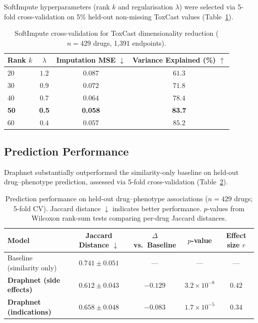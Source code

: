 \documentclass[11pt]{article}
\begin{document}
SoftImpute hyperparameters (rank $k$ and regularisation $\lambda$) were selected via 5-fold cross-validation on 5\% held-out non-missing ToxCast values (Table~\ref{tab:softimpute}).

\begin{table}[H]
\centering
\caption{SoftImpute cross-validation for ToxCast dimensionality reduction ($n = 429$ drugs, 1,391 endpoints).}
\label{tab:softimpute}
\begin{tabular}{lccc}
\toprule
Rank $k$ & $\lambda$ & Imputation MSE $\downarrow$ & Variance Explained (\%) $\uparrow$ \\
\midrule
20 & $1.2$ & $0.087$ & $61.3$ \\
30 & $0.9$ & $0.072$ & $71.8$ \\
40 & $0.7$ & $0.064$ & $78.4$ \\
\textbf{50} & \textbf{0.5} & \textbf{0.058} & \textbf{83.7} \\
60 & $0.4$ & $0.057$ & $85.2$ \\
\bottomrule
\end{tabular}
\end{table}

\subsection{Prediction Performance}

Draphnet substantially outperformed the similarity-only baseline on held-out drug--phenotype prediction, assessed via 5-fold cross-validation (Table~\ref{tab:prediction}).

\begin{table}[H]
\centering
\caption{Prediction performance on held-out drug--phenotype associations ($n = 429$ drugs; 5-fold CV). Jaccard distance $\downarrow$ indicates better performance. $p$-values from Wilcoxon rank-sum tests comparing per-drug Jaccard distances.}
\label{tab:prediction}
\begin{tabular}{lcccc}
\toprule
Model & Jaccard Distance $\downarrow$ & $\Delta$ vs.\ Baseline & $p$-value & Effect size $r$ \\
\midrule
Baseline (similarity only) & $0.741 \pm 0.051$ & --- & --- & --- \\
\textbf{Draphnet (side effects)} & $\mathbf{0.612 \pm 0.043}$ & $-0.129$ & $3.2 \times 10^{-8}$ & $0.42$ \\
\textbf{Draphnet (indications)} & $\mathbf{0.658 \pm 0.048}$ & $-0.083$ & $1.7 \times 10^{-5}$ & $0.34$ \\
\bottomrule
\end{tabular}
\end{table}
\end{document}
